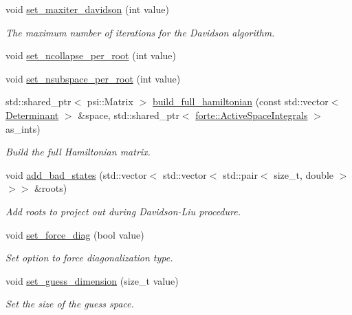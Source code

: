 \begin{DoxyCompactItemize}
void \mbox{\hyperlink{classforte_1_1_sparse_c_i_solver_a414c602c7fd2f5e05d8c15f0b925db51}{set\+\_\+maxiter\+\_\+davidson}} (int value)
\begin{DoxyCompactList}\small\item\em The maximum number of iterations for the Davidson algorithm. \end{DoxyCompactList}\item 
void \mbox{\hyperlink{classforte_1_1_sparse_c_i_solver_a98223e6d0c0f619f74fa1e2b2a0088b2}{set\+\_\+ncollapse\+\_\+per\+\_\+root}} (int value)
\item 
void \mbox{\hyperlink{classforte_1_1_sparse_c_i_solver_afb3b309aa3bca16bcfc5c19a32e15073}{set\+\_\+nsubspace\+\_\+per\+\_\+root}} (int value)
\item 
std\+::shared\+\_\+ptr$<$ psi\+::\+Matrix $>$ \mbox{\hyperlink{classforte_1_1_sparse_c_i_solver_afb31b5630245596421d2dc4f2dd35221}{build\+\_\+full\+\_\+hamiltonian}} (const std\+::vector$<$ \mbox{\hyperlink{namespaceforte_a2076c63fd7b8732004d9e1442ce527c1}{Determinant}} $>$ \&space, std\+::shared\+\_\+ptr$<$ \mbox{\hyperlink{classforte_1_1_active_space_integrals}{forte\+::\+Active\+Space\+Integrals}} $>$ as\+\_\+ints)
\begin{DoxyCompactList}\small\item\em Build the full Hamiltonian matrix. \end{DoxyCompactList}\item 
void \mbox{\hyperlink{classforte_1_1_sparse_c_i_solver_ac543dcf856d538cd62441943ddca5b8d}{add\+\_\+bad\+\_\+states}} (std\+::vector$<$ std\+::vector$<$ std\+::pair$<$ size\+\_\+t, double $>$$>$$>$ \&roots)
\begin{DoxyCompactList}\small\item\em Add roots to project out during Davidson-\/\+Liu procedure. \end{DoxyCompactList}\item 
void \mbox{\hyperlink{classforte_1_1_sparse_c_i_solver_a5285d4f39100503fc4fb3e2776949c7b}{set\+\_\+force\+\_\+diag}} (bool value)
\begin{DoxyCompactList}\small\item\em Set option to force diagonalization type. \end{DoxyCompactList}\item 
void \mbox{\hyperlink{classforte_1_1_sparse_c_i_solver_aecd729bea29befdfca3226affbd26855}{set\+\_\+guess\+\_\+dimension}} (size\+\_\+t value)
\begin{DoxyCompactList}\small\item\em Set the size of the guess space. \end{DoxyCompactList}\item 

\end{DoxyCompactItemize}
